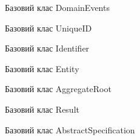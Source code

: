 \vspace*{\fill}
\vspace*{\fill}

\clearpage

\vspace{\baselineskip}

Базовий клас DomainEvents


Базовий клас UniqueID


Базовий клас Identifier


Базовий клас Entity


Базовий клас AggregateRoot


Базовий клас Result


Базовий клас AbstractSpecification


\clearpage
